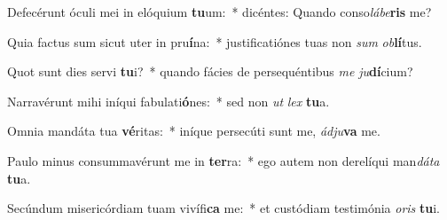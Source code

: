 \item Defecérunt óculi mei in elóquium \textbf{tu}um:~* dicéntes: Quando conso\textit{lá}\textit{be}\textbf{ris} me?
\item Quia factus sum sicut uter in pru\textbf{í}na:~* justificatiónes tuas non \textit{sum} \textit{ob}\textbf{lí}tus.
\item Quot sunt dies servi \textbf{tu}i?~* quando fácies de persequéntibus \textit{me} \textit{ju}\textbf{dí}cium?
\item Narravérunt mihi iníqui fabulati\textbf{ó}nes:~* sed non \textit{ut} \textit{lex} \textbf{tu}a.
\item Omnia mandáta tua \textbf{vé}ritas:~* iníque persecúti sunt me, \textit{ád}\textit{ju}\textbf{va} me.
\item Paulo minus consummavérunt me in \textbf{ter}ra:~* ego autem non derelíqui man\textit{dá}\textit{ta} \textbf{tu}a.
\item Secúndum misericórdiam tuam vivífi\textbf{ca} me:~* et custódiam testimónia \textit{o}\textit{ris} \textbf{tu}i.
